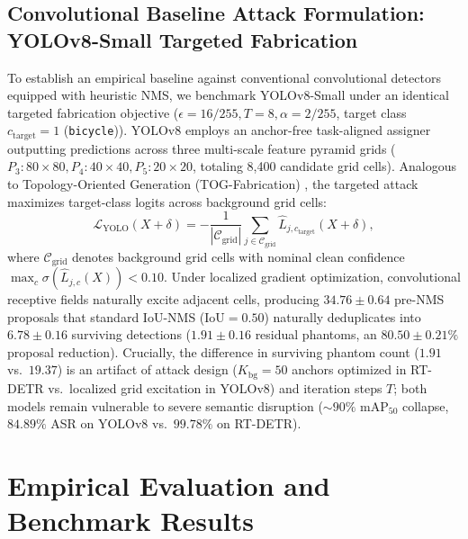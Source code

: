 \documentclass[preprint,12pt]{elsarticle}
\begin{document}
\subsection{Convolutional Baseline Attack Formulation: YOLOv8-Small Targeted Fabrication}
\label{sec:yolo_formulation}
To establish an empirical baseline against conventional convolutional detectors equipped with heuristic NMS, we benchmark YOLOv8-Small under an identical targeted fabrication objective ($\epsilon=16/255, T=8, \alpha=2/255$, target class $c_{\mathrm{target}}=1$ (\texttt{bicycle})). YOLOv8 employs an anchor-free task-aligned assigner outputting predictions across three multi-scale feature pyramid grids ($P_3: 80\times 80, P_4: 40\times 40, P_5: 20\times 20$, totaling 8,400 candidate grid cells). Analogous to Topology-Oriented Generation (TOG-Fabrication) \citep{chow2020adversarial}, the targeted attack maximizes target-class logits across background grid cells:
\begin{equation}
    \label{eq:yolo_loss}
    \mathcal{L}_{\mathrm{YOLO}}(X + \delta) = - \frac{1}{|\mathcal{C}_{\mathrm{grid}}|} \sum_{j \in \mathcal{C}_{\mathrm{grid}}} \hat{L}_{j, c_{\mathrm{target}}}(X + \delta),
\end{equation}
where $\mathcal{C}_{\mathrm{grid}}$ denotes background grid cells with nominal clean confidence $\max_c \sigma(\hat{L}_{j,c}(X)) < 0.10$. Under localized gradient optimization, convolutional receptive fields naturally excite adjacent cells, producing $34.76 \pm 0.64$ pre-NMS proposals that standard IoU-NMS ($\mathrm{IoU}=0.50$) naturally deduplicates into $6.78 \pm 0.16$ surviving detections ($1.91 \pm 0.16$ residual phantoms, an $80.50 \pm 0.21\%$ proposal reduction). Crucially, the difference in surviving phantom count ($1.91$ vs.\ $19.37$) is an artifact of attack design ($K_{\mathrm{bg}}=50$ anchors optimized in RT-DETR vs.\ localized grid excitation in YOLOv8) and iteration steps $T$; both models remain vulnerable to severe semantic disruption ($\sim 90\%$ $\mathrm{mAP}_{50}$ collapse, $84.89\%$ ASR on YOLOv8 vs.\ $99.78\%$ on RT-DETR).

\section{Empirical Evaluation and Benchmark Results}
\label{sec:experiments}
\end{document}
